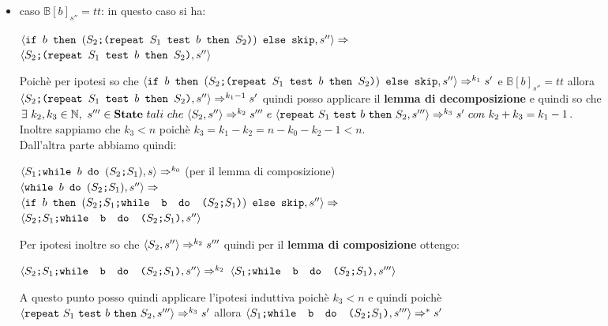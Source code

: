 {\begin{itemize}
\begin{center}
		$\confSs{\wbS{b}{(\concat{$S_2$}{$S_1$})}}{s''}$
		\end{center}
		Poichè per ipotesi sappiamo che $\confSs{S_1}{s}\Rar{k_0}s''$. Inoltre
		sempre per ipotesi abbiamo che $\mathbb{B}[b]_{s''}=ff$, quindi:
		\begin{center}
		$\confSs{\wbS{b}{(\concat{$S_2$}{$S_1$})}}{s''}\Rar{}$\\
		$\confSs{\ifABC{b}{(\concat{$S_2$}{(\concat{$S_1$}
		{\wbS{b}{(\concat{$S_2$}{$S_1$})}})})}{\skipistr}}{s''}\Rar{}$\\
		$\confSs{\skipistr}{s''}\Rar{}s''$
		\end{center}
		Ottenedo lo stesso stato finale quindi dell'implicazione di partenza.

		\item caso $\mathbb{B}[b]_{s''}=tt$: in questo caso si ha:
		\begin{center}
		$\confSs{\ifABC{b}{(\concat{$S_2$}{(\repeatSbS{$S_1$}{$b$}{$S_2$})})}
		{\skipistr}}{s''}\Rar{}$\\
		$\confSs{\concat{$S_2$}{(\repeatSbS{$S_1$}{$b$}{$S_2$})}}{s''}$\\
		\end{center}
		Poichè per ipotesi so che $\confSs{\ifABC{b}{(\concat{$S_2$}
		{(\repeatSbS{$S_1$}{$b$}{$S_2$})})}{\skipistr}}{s''}\Rar{k_1}s'$ e 
		$\mathbb{B}[b]_{s''}=tt$ allora 
		$\confSs{\concat{$S_2$}{(\repeatSbS{$S_1$}{$b$}{$S_2$})}}{s''}
		\Rar{k_1-1}s'$ quindi posso applicare il \textbf{lemma di 
		decomposizione} e quindi so che $\exists{}~k_2,k_3\in{}\mathbb{N},~
		s'''\in{}\states{}~tali~che~\confSs{S_2}{s''}\Rar{k_2}s'''~e
		~\confSs{\repeatSbS{S_1}{b}{S_2}}{s'''}\Rar{k_3}s'~con~
		k_2+k_3=k_1-1$.\\
		Inoltre sappiamo che $k_3<n$ poichè $k_3=k_1-k_2=n-k_0-k_2-1<n$.\\
		Dall'altra parte abbiamo quindi:
		\begin{center}
		$\confSs{\PDef{}}{s}\Rar{k_0}$ (per il lemma di composizione)\\
		$\confSs{\wbS{b}{(\concat{$S_2$}{$S_1$})}}{s''}\Rar{}$\\
		$\confSs{\ifABC{b}{(\concat{\concat{$S_2$}{$S_1$}}
		{\wbS{b}{(\concat{$S_2$}{$S_1$})}})}{\skipistr}}{s''}\Rar{}$\\
		$\confSs{\concat{\concat{$S_2$}{$S_1$}}
		{\wbS{b}{(\concat{$S_2$}{$S_1$})}}}{s''}$
		\end{center}
		Per ipotesi inoltre so che $\confSs{S_2}{s''}\Rar{k_2}s'''$ quindi per
		il \textbf{lemma di composizione} ottengo:
		\begin{center}
		$\confSs{\concat{\concat{$S_2$}{$S_1$}}
		{\wbS{b}{(\concat{$S_2$}{$S_1$})}}}{s''}\Rar{k_2}$
		$\confSs{\concat{$S_1$}{\wbS{b}{(\concat{$S_2$}{$S_1$})}}}{s'''}$
		\end{center}
		A questo punto posso quindi applicare l'ipotesi induttiva poichè $k_3<n$
		e quindi poichè \\$\confSs{\repeatSbS{S_1}{b}{S_2}}{s'''}\Rar{k_3}s'$
		allora $\confSs{\concat{$S_1$}{\wbS{b}{(\concat{$S_2$}{$S_1$})}}}{s'''}
		\Rar{*}s'$

	\end{itemize}
}
\newpage